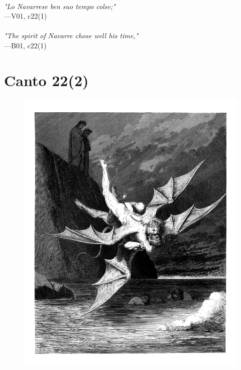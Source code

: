 \documentclass[../Dore_vision.tex]{subfiles}
\begin{document}
\begin{center}
\begin{minipage}{0.8\linewidth}
\textit{\\
"Lo Navarrese ben suo tempo colse;"} \\
—V01, c22(1) \\~\\
\textit{"The spirit of Navarre chose well his time,"} \\
—B01, c22(1)
\end{minipage}
\end{center}

\newpage

\section{Canto 22(2)}

\begin{figure}[ht]
\centering
\includegraphics[height=\figsize]{illustrations/book_1/V01, c22(2).jpg}
\end{figure}
\end{document}
